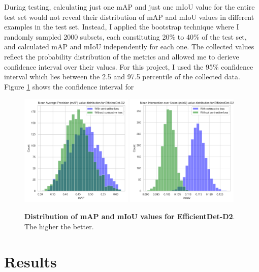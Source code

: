 \documentclass[12pt,a4paper,twoside,openany]{report}
\begin{document}
During testing, calculating just one mAP and just one mIoU value for the entire test set would not reveal their distribution of mAP and mIoU values in different examples in the test set. Instead, I applied the bootstrap technique where I randomly sampled 2000 subsets, each constituting 20\% to 40\% of the test set, and calculated mAP and mIoU independently for each one. The collected values reflect the probability distribution of the metrics and allowed me to derieve confidence interval over their values. For this project, I used the 95\% confidence interval which lies between the 2.5 and 97.5 percentile of the collected data. Figure \ref{fig:d2_spread} shows the confidence interval for 

\begin{figure}[H]
    \centering
    \includegraphics[width=0.48\textwidth]{figs/eval/results/d2_map_spread.png}
    \includegraphics[width=0.48\textwidth]{figs/eval/results/d2_miou_spread.png}
    \caption{\textbf{Distribution of mAP and mIoU values for EfficientDet-D2}. The higher the better.}
    \label{fig:d2_spread}
\end{figure}

\section{Results} \label{section:eval_results}
\end{document}
